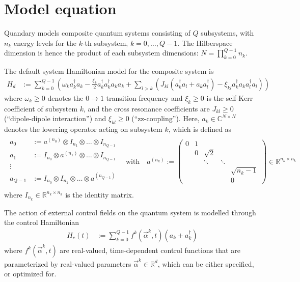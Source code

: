 \documentclass[11pt]{article}
\newcommand{\R}{\mathds{R}}
\newcommand{\C}{\mathds{C}}
\begin{document}
\section{Model equation}\label{sec:model}
Quandary models composite quantum systems consisting of $Q$ subsystems, with $n_k$ energy levels for the
$k$-th subsystem, $k=0,\dots,Q-1$. The Hilberspace dimension is hence the product of each subsystem dimensions: $N = \prod_{k=0}^{Q-1} n_k$. 

The default system Hamiltonian model for the composite system is
\begin{align}
  H_d &:= \sum_{k=0}^{Q-1} \left(\omega_k a_k^{\dagger}a_k- \frac{\xi_k}{2} a_k^{\dagger}a_k^{\dagger}a_k a_k  + \sum_{l> k} \left(  J_{kl} \left( a_k^\dagger a_l + a_k a_l^\dagger \right) -\xi_{kl} a_{k}^{\dagger}a_{k}   a_{l}^{\dagger} a_{l} \right)\right)
\end{align}
where $\omega_k\geq 0$ denotes the $0 \rightarrow 1$ transition frequency and $\xi_k\geq 0$ is the self-Kerr coefficient of subsystem $k$, and the cross resonance coefficients are $J_{kl}\geq 0$ (``dipole-dipole interaction'') and $\xi_{kl}\geq 0$ (``zz-coupling''). Here,
$a_k\in \C^{N\times N}$ denotes the lowering operator acting on subsystem $k$, which is defined as
\begin{align}
  \begin{array}{rl}
  a_0 &:= a^{(n_0)} \otimes I_{n_1} \otimes \dots \otimes
  I_{n_{Q-1}}\\
  a_1 &:= I_{n_0} \otimes a^{(n_1)} \otimes \dots \otimes
  I_{n_{Q-1}}\\
  \vdots \, & \\
  a_{Q-1} &:= I_{n_0} \otimes I_{n_1} \otimes \dots \otimes
  a^{(n_{Q-1})}\\
  \end{array}
  \quad \text{with}\quad
 a^{(n_k)} := \begin{pmatrix}
   0 & 1 &          &         &    \\
     & 0 & \sqrt{2} &         &     \\
     &   & \ddots   & \ddots  &    \\
     &   &          &         & \sqrt{n_k-1}  \\
     &   &          &         & 0   
 \end{pmatrix} \in \R^{n_k \times n_k}
\end{align}
where $I_{n_k} \in \R^{n_k \times n_k}$ is the identity matrix.



The action of external control fields on the quantum system is modelled through the control Hamiltonian 
\begin{align}
  H_c(t) &:= \sum_{k=0}^{Q-1} f^k(\vec{\alpha}^k,t) \left(a_k + a_k^\dagger \right)
\end{align}
where $f^k(\vec{\alpha}^k,t)$ are real-valued, time-dependent control functions that are parameterized by real-valued parameters $\vec{\alpha}^k\in \R^d$, which can be either specified, or optimized for. 
\end{document}
